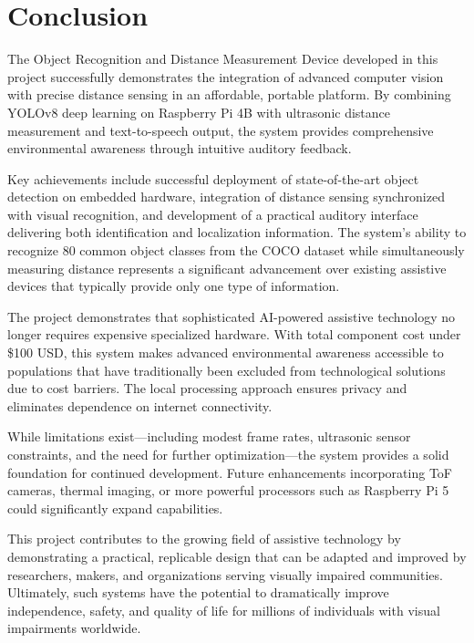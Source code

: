 \documentclass[conference]{IEEEtran}
\begin{document}
\section{Conclusion}
The Object Recognition and Distance Measurement Device developed in this project successfully demonstrates the integration of advanced computer vision with precise distance sensing in an affordable, portable platform. By combining YOLOv8 deep learning on Raspberry Pi 4B with ultrasonic distance measurement and text-to-speech output, the system provides comprehensive environmental awareness through intuitive auditory feedback.

Key achievements include successful deployment of state-of-the-art object detection on embedded hardware, integration of distance sensing synchronized with visual recognition, and development of a practical auditory interface delivering both identification and localization information. The system's ability to recognize 80 common object classes from the COCO dataset while simultaneously measuring distance represents a significant advancement over existing assistive devices that typically provide only one type of information.

The project demonstrates that sophisticated AI-powered assistive technology no longer requires expensive specialized hardware. With total component cost under \$100 USD, this system makes advanced environmental awareness accessible to populations that have traditionally been excluded from technological solutions due to cost barriers. The local processing approach ensures privacy and eliminates dependence on internet connectivity.

While limitations exist—including modest frame rates, ultrasonic sensor constraints, and the need for further optimization—the system provides a solid foundation for continued development. Future enhancements incorporating ToF cameras, thermal imaging, or more powerful processors such as Raspberry Pi 5 could significantly expand capabilities.

This project contributes to the growing field of assistive technology by demonstrating a practical, replicable design that can be adapted and improved by researchers, makers, and organizations serving visually impaired communities. Ultimately, such systems have the potential to dramatically improve independence, safety, and quality of life for millions of individuals with visual impairments worldwide.
\end{document}
